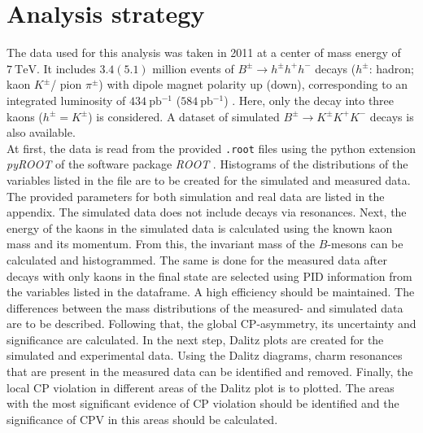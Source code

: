 \section{Analysis strategy}
\label{sec:Analysis_strategy}
The data used for this analysis was taken in 2011 at a center of mass energy of $\qty{7}{\tera\eV}$. It includes $\num{3.4}(\num{5.1})$ million events of 
$B^{\pm} \to h^{\pm} h^+ h^-$ decays ($h^{\pm}$: hadron; kaon $K^{\pm}$/ pion {$\pi^{\pm}$}) with dipole magnet polarity up (down), 
corresponding to an integrated luminosity of $\qty{434}{\pico\barn^{-1}}$ ($\qty{584}{\pico\barn^{-1}}$) \cite{LHCb_CPV}. 
Here, only the decay into three kaons ($h^{\pm} =  K^{\pm}$) is considered.
A dataset of simulated $B^{\pm} \to K^{\pm} K^+ K^-$ decays is also available. \\
At first, the data is read from the provided \texttt{.root} files using the python extension \textit{pyROOT} of the software package \textit{ROOT} \cite{ROOT}.
Histograms of the distributions of the variables listed in the file are to be created for the simulated and measured data. The provided parameters for both simulation
and real data are listed in the appendix. The simulated data does not include decays via resonances.
Next, the energy of the kaons in the simulated data is calculated using the known kaon mass and its momentum. From this, the invariant mass of the $B$-mesons can be calculated 
and histogrammed. 
The same is done for the measured data after decays with only kaons in the final state are selected using PID information from the variables listed in the dataframe. 
A high efficiency should be maintained. The differences between the mass distributions of the measured- and simulated data are to be described.
Following that, the global CP-asymmetry, its uncertainty and significance are calculated.
In the next step, Dalitz plots are created for the simulated and experimental data. Using the Dalitz diagrams, charm resonances that are present in the measured data can be 
identified and removed. Finally, the local CP violation in different areas of the Dalitz plot is to plotted. The areas with the most significant evidence of CP violation 
should be identified and the significance of CPV in this areas should be calculated. 
